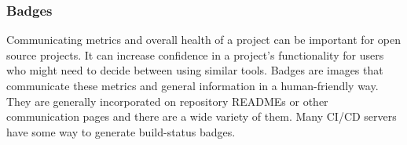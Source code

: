 \subsubsection{Badges}
Communicating metrics and overall health of a project can be important for open source projects. It can increase confidence in a project's functionality for users who might need to decide between using similar tools. Badges are images that communicate these metrics and general information in a human-friendly way. They are generally incorporated on repository READMEs or other communication pages and there are a wide variety of them.\cite{shields} Many CI/CD servers have some way to generate build-status badges.



